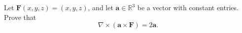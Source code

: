 \begin{problem}
Let $\mathbf{F}(x,y,z) = (x,y,z)$, and let $\mathbf{a}\in\mathbb{R}^3$ be a vector with constant entries. Prove that 
\[
\nabla\times(\mathbf{a}\times\mathbf{F}) = 2\mathbf{a}.
\]
\end{problem}